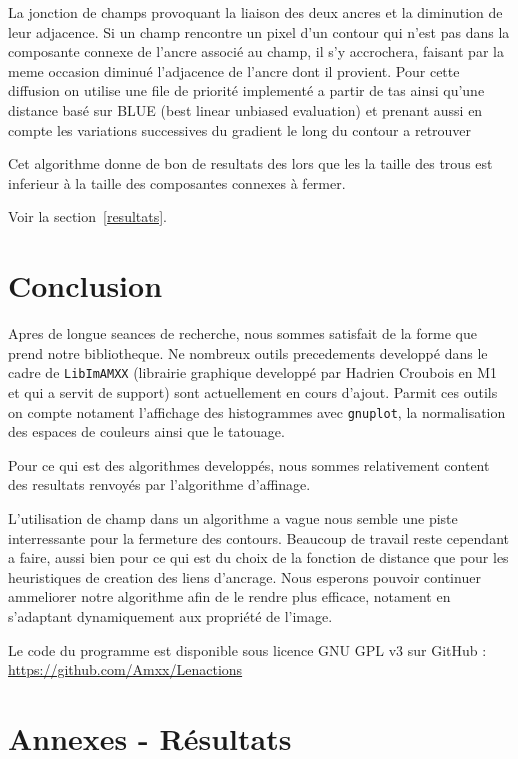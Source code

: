 La jonction de champs provoquant la liaison des deux ancres et la diminution de leur adjacence. Si un champ rencontre un pixel d'un contour qui n'est pas dans la composante connexe de l'ancre associé au champ, il s'y accrochera, faisant par la meme occasion diminué l'adjacence de l'ancre dont il provient.
Pour cette diffusion on utilise une file de priorité implementé a partir de tas ainsi qu'une distance basé sur \textsc{BLUE} (best linear unbiased evaluation) et prenant aussi en compte les variations successives du gradient le long du contour a retrouver

Cet algorithme donne de bon de resultats des lors que les la taille des trous est inferieur à la taille des composantes connexes à fermer. 

Voir la section~\ref{resultats}.

\section*{Conclusion}

Apres de longue seances de recherche, nous sommes satisfait de la forme que prend notre bibliotheque. Ne nombreux outils precedements developpé dans le cadre de \texttt{LibImAMXX} (librairie graphique developpé par Hadrien Croubois en M1 et qui a servit de support) sont actuellement en cours d'ajout. Parmit ces outils on compte notament l'affichage des histogrammes avec \texttt{gnuplot}, la normalisation des espaces de couleurs ainsi que le tatouage.

Pour ce qui est des algorithmes developpés, nous sommes relativement content des resultats renvoyés par l'algorithme d'affinage.

L'utilisation de champ dans un algorithme a vague nous semble une piste interressante pour la fermeture des contours. Beaucoup de travail reste cependant a faire, aussi bien pour ce qui est du choix de la fonction de distance que pour les heuristiques de creation des liens d'ancrage.
Nous esperons pouvoir continuer ammeliorer notre algorithme afin de le rendre plus efficace, notament en s'adaptant dynamiquement aux propriété de l'image.

Le code du programme est disponible sous licence GNU GPL v3 sur GitHub : \url{https://github.com/Amxx/Lenactions}

\newpage
\section*{Annexes - Résultats} \label{resultats}


